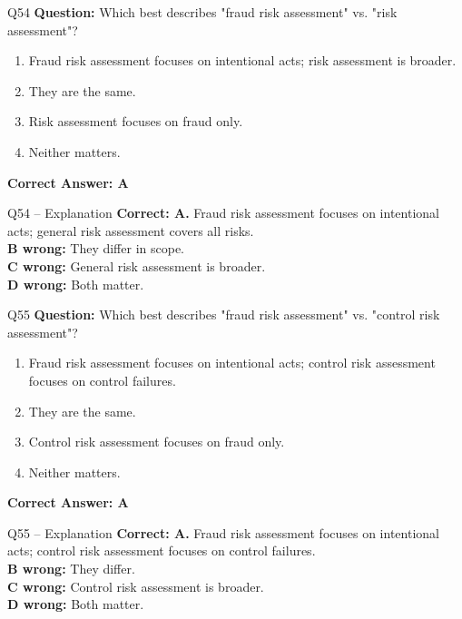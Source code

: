 \documentclass[aspectratio=169,10pt]{beamer}
\begin{document}
	\begin{frame}[t]{Q54}
		\small
		\textbf{Question:} Which best describes "fraud risk assessment" vs. "risk assessment"?
		\begin{enumerate}[label=\Alph*.,itemsep=1pt,topsep=2pt]
			\item Fraud risk assessment focuses on intentional acts; risk assessment is broader.
			\item They are the same.
			\item Risk assessment focuses on fraud only.
			\item Neither matters.
		\end{enumerate}
		\vspace{4pt}
		\textbf{Correct Answer: A}
	\end{frame}
	
	\begin{frame}[t]{Q54 -- Explanation}
		\small
		\textbf{Correct: A.} Fraud risk assessment focuses on intentional acts; general risk assessment covers all risks. \\[4pt]
		\textbf{B wrong:} They differ in scope. \\[2pt]
		\textbf{C wrong:} General risk assessment is broader. \\[2pt]
		\textbf{D wrong:} Both matter.
	\end{frame}
	
	\begin{frame}[t]{Q55}
		\small
		\textbf{Question:} Which best describes "fraud risk assessment" vs. "control risk assessment"?
		\begin{enumerate}[label=\Alph*.,itemsep=1pt,topsep=2pt]
			\item Fraud risk assessment focuses on intentional acts; control risk assessment focuses on control failures.
			\item They are the same.
			\item Control risk assessment focuses on fraud only.
			\item Neither matters.
		\end{enumerate}
		\vspace{4pt}
		\textbf{Correct Answer: A}
	\end{frame}
	
	\begin{frame}[t]{Q55 -- Explanation}
		\small
		\textbf{Correct: A.} Fraud risk assessment focuses on intentional acts; control risk assessment focuses on control failures. \\[4pt]
		\textbf{B wrong:} They differ. \\[2pt]
		\textbf{C wrong:} Control risk assessment is broader. \\[2pt]
		\textbf{D wrong:} Both matter.
	\end{frame}
	
\end{document}
